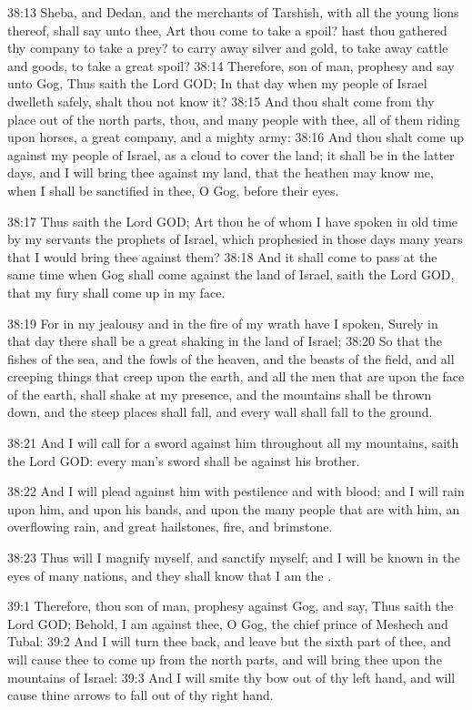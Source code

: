 38:13 Sheba, and Dedan, and the merchants of Tarshish, with all the young lions thereof, shall say unto thee, Art thou come to take a spoil? hast thou gathered thy company to take a prey? to carry away silver and gold, to take away cattle and goods, to take a great spoil?  38:14 Therefore, son of man, prophesy and say unto Gog, Thus saith the Lord GOD; In that day when my people of Israel dwelleth safely, shalt thou not know it?  38:15 And thou shalt come from thy place out of the north parts, thou, and many people with thee, all of them riding upon horses, a great company, and a mighty army: 38:16 And thou shalt come up against my people of Israel, as a cloud to cover the land; it shall be in the latter days, and I will bring thee against my land, that the heathen may know me, when I shall be sanctified in thee, O Gog, before their eyes.

38:17 Thus saith the Lord GOD; Art thou he of whom I have spoken in old time by my servants the prophets of Israel, which prophesied in those days many years that I would bring thee against them?  38:18 And it shall come to pass at the same time when Gog shall come against the land of Israel, saith the Lord GOD, that my fury shall come up in my face.

38:19 For in my jealousy and in the fire of my wrath have I spoken, Surely in that day there shall be a great shaking in the land of Israel; 38:20 So that the fishes of the sea, and the fowls of the heaven, and the beasts of the field, and all creeping things that creep upon the earth, and all the men that are upon the face of the earth, shall shake at my presence, and the mountains shall be thrown down, and the steep places shall fall, and every wall shall fall to the ground.

38:21 And I will call for a sword against him throughout all my mountains, saith the Lord GOD: every man's sword shall be against his brother.

38:22 And I will plead against him with pestilence and with blood; and I will rain upon him, and upon his bands, and upon the many people that are with him, an overflowing rain, and great hailstones, fire, and brimstone.

38:23 Thus will I magnify myself, and sanctify myself; and I will be known in the eyes of many nations, and they shall know that I am the \LORD.

39:1 Therefore, thou son of man, prophesy against Gog, and say, Thus saith the Lord GOD; Behold, I am against thee, O Gog, the chief prince of Meshech and Tubal: 39:2 And I will turn thee back, and leave but the sixth part of thee, and will cause thee to come up from the north parts, and will bring thee upon the mountains of Israel: 39:3 And I will smite thy bow out of thy left hand, and will cause thine arrows to fall out of thy right hand.

